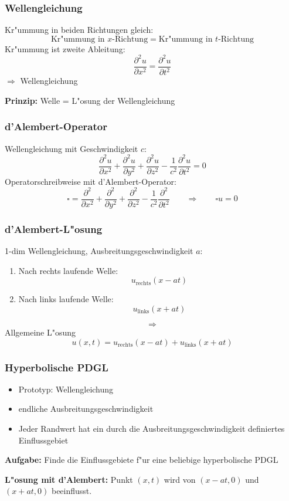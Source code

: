 \documentclass[handout]{beamer}
\begin{document}
\begin{frame}
\frametitle{Wellengleichung}
Kr"ummung in beiden Richtungen gleich:
\[
\text{Kr"ummung in $x$-Richtung}
=
\text{Kr"ummung in $t$-Richtung}
\]
Kr"ummung ist zweite Ableitung:
\[
\frac{\partial^2 u}{\partial x^2}
=
\frac{\partial^2 u}{\partial t^2}
\]
$\Rightarrow$
Wellengleichung
\bigskip

{\bf Prinzip:}
Welle = L"osung der Wellengleichung
\end{frame}

\begin{frame}
\frametitle{d'Alembert-Operator}
Wellengleichung mit Geschwindigkeit $c$:
\[
\frac{\partial^2u}{\partial x^2}
+
\frac{\partial^2u}{\partial y^2}
+
\frac{\partial^2u}{\partial z^2}
-
\frac1{c^2}
\frac{\partial^2u}{\partial t^2}
=
0
\]
Operatorschreibweise mit d'Alembert-Operator:
\[
\square 
=
\frac{\partial^2}{\partial x^2}
+
\frac{\partial^2}{\partial y^2}
+
\frac{\partial^2}{\partial z^2}
-
\frac1{c^2}
\frac{\partial^2}{\partial t^2}
\qquad
\Rightarrow
\qquad
\square u=0
\]
\end{frame}

\begin{frame}
\frametitle{d'Alembert-L"osung}
1-dim Wellengleichung, Ausbreitungsgeschwindigkeit $a$:
\begin{enumerate}
\item
Nach rechts laufende Welle:
\[
u_{\text{rechts}}(x-at)
\]
\item
Nach links laufende Welle:
\[
u_{\text{links}}(x+at)
\]
\end{enumerate}
\pause
\[
\Rightarrow
\]
Allgemeine L"osung
\[
u(x,t)
=
u_{\text{rechts}}(x-at)
+
u_{\text{links}}(x+at)
\]
\end{frame}


\begin{frame}
\frametitle{Hyperbolische PDGL}

\begin{itemize}[<+->]
\item
Prototyp: Wellengleichung
\item
endliche Ausbreitungsgeschwindigkeit
\item
Jeder Randwert hat ein durch die Ausbreitungsgeschwindigkeit
definiertes Einflussgebiet
\end{itemize}
\pause
\bigskip

{\bf Aufgabe:}
Finde die Einflussgebiete f"ur eine beliebige hyperbolische PDGL
\bigskip

\pause
{\bf L"osung mit d'Alembert:}
Punkt $(x,t)$ wird von $(x-at,0)$ und $(x+at,0)$ beeinflusst.

\end{frame}
\end{document}
